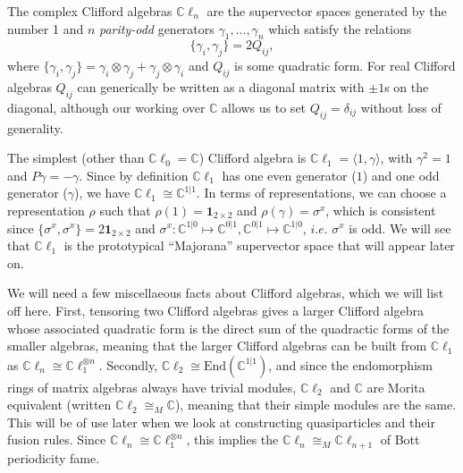 \documentclass[12pt,a4paper]{article}
\newcommand{\tp}{\otimes}
\newcommand{\unit}{\mathbf{1}}
\newcommand{\cc}{\mathbb{C}}
\newcommand\be            {\begin{equation}}
\newcommand\ee            {\end{equation}}
\newcommand{\End}{\text{End}}
\newcommand{\cl}{\mathbb{C}\ell}
\begin{document}
The complex Clifford algebras $\cl_n$ are the supervector spaces generated by the number 1 and $n$ {\it parity-odd} generators $\gamma_1,\dots,\gamma_n$ which satisfy the relations 
\be \{\gamma_i,\gamma_j\} = 2Q_{ij},\ee
where $\{\gamma_i,\gamma_j\} = \gamma_i\tp \gamma_j + \gamma_j\tp\gamma_i$ and $Q_{ij}$ is some quadratic form. For real Clifford algebras $Q_{ij}$ can generically be written as a diagonal matrix with $\pm1$s on the diagonal, although our working over $\cc$ allows us to set $Q_{ij} =\delta_{ij}$ without loss of generality.

The simplest (other than $\cl_0 = \cc$) Clifford algebra is $\cl_1 = \langle 1, \gamma\rangle$, with $\gamma^2 = 1$ and $P\gamma = -\gamma$. 
Since by definition $\cl_1$ has one even generator ($1$) and one odd generator ($\gamma$), we have $\cl_1 \cong \cc^{1|1}$. In terms of representations, we can choose a representation $\rho$ such that $\rho(1) = \unit_{2\times 2}$ and $\rho(\gamma) = \sigma^x$, which is consistent since $\{\sigma^x,\sigma^x\} = 2\unit_{2\times2}$ and $\sigma^x : \cc^{1|0} \mapsto \cc^{0|1}, \cc^{0|1}\mapsto \cc^{1|0}$, $i.e.$ $\sigma^x$ is odd. We will see that $\cl_1$ is the prototypical ``Majorana'' supervector space that will appear later on.

We will need a few miscellaeous facts about Clifford algebras, which we will list off here. First, tensoring two Clifford algebras gives a larger Clifford algebra whose associated quadratic form is the direct sum of the quadractic forms of the smaller algebras, meaning that the larger Clifford algebras can be built from $\cl_1$ as $\cl_n \cong \cl_1^{\tp n}$. Secondly, $\cl_2 \cong \End(\cc^{1|1})$, and since the endomorphism rings of matrix algebras always have trivial modules, $\cl_2$ and $\cc$ are Morita equivalent (written $\cl_2 \cong_M \cc$), meaning that their simple modules are the same. This will be of use later when we look at constructing quasiparticles and their fusion rules. Since $\cl_n \cong \cl_1^{\tp n}$, this implies the $\cl_n \cong_M \cl_{n+1}$ of Bott periodicity fame. %
\end{document}
